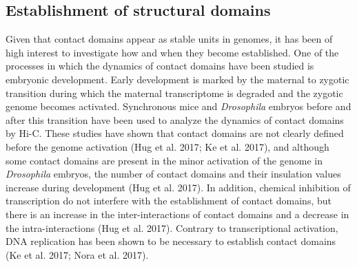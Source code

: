 		\subsection{Establishment of structural domains}

Given that contact domains appear as stable units in genomes, it has been of high interest to investigate how and when they become established. One of the processes in which the dynamics of contact domains have been studied is embryonic development. Early development is marked by the maternal to zygotic transition during which the maternal transcriptome is degraded and the zygotic genome becomes activated. Synchronous mice and \textit{Drosophila} embryos before and after this transition have been used to analyze the dynamics of contact domains by Hi-C. These studies have shown that contact domains are not clearly defined before the genome activation (Hug et al. 2017; Ke et al. 2017), and although some contact domains are present in the minor activation of the genome in \textit{Drosophila} embryos, the number of contact domains and their insulation values increase during development (Hug et al. 2017). In addition, chemical inhibition of transcription do not interfere with the establishment of contact domains, but there is an increase in the inter-interactions of contact domains and a decrease in the intra-interactions (Hug et al. 2017). Contrary to transcriptional activation, DNA replication has been shown to be necessary to establish contact domains (Ke et al. 2017; Nora et al. 2017).\\

